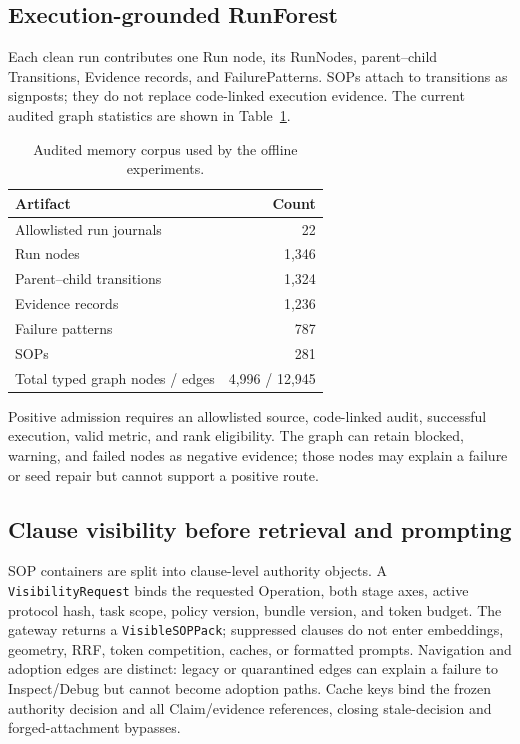 \documentclass{article}
\begin{document}
\subsection{Execution-grounded RunForest}

Each clean run contributes one Run node, its RunNodes, parent--child
Transitions, Evidence records, and FailurePatterns.  SOPs attach to transitions
as signposts; they do not replace code-linked execution evidence.  The current
audited graph statistics are shown in Table~\ref{tab:corpus}.

\begin{table}[t]
\caption{Audited memory corpus used by the offline experiments.}
\label{tab:corpus}
\centering
\small
\begin{tabular}{lr}
\toprule
Artifact & Count \\
\midrule
Allowlisted run journals & 22 \\
Run nodes & 1,346 \\
Parent--child transitions & 1,324 \\
Evidence records & 1,236 \\
Failure patterns & 787 \\
SOPs & 281 \\
Total typed graph nodes / edges & 4,996 / 12,945 \\
\bottomrule
\end{tabular}
\end{table}

Positive admission requires an allowlisted source, code-linked audit, successful
execution, valid metric, and rank eligibility.  The graph can retain blocked,
warning, and failed nodes as negative evidence; those nodes may explain a
failure or seed repair but cannot support a positive route.

\subsection{Clause visibility before retrieval and prompting}

SOP containers are split into clause-level authority objects.  A
\texttt{VisibilityRequest} binds the requested Operation, both stage axes,
active protocol hash, task scope, policy version, bundle version, and token
budget.  The gateway returns a \texttt{VisibleSOPPack}; suppressed clauses do
not enter embeddings, geometry, RRF, token competition, caches, or formatted
prompts.  Navigation and adoption edges are distinct: legacy or quarantined
edges can explain a failure to Inspect/Debug but cannot become adoption paths.
Cache keys bind the frozen authority decision and all Claim/evidence references,
closing stale-decision and forged-attachment bypasses.
\end{document}
